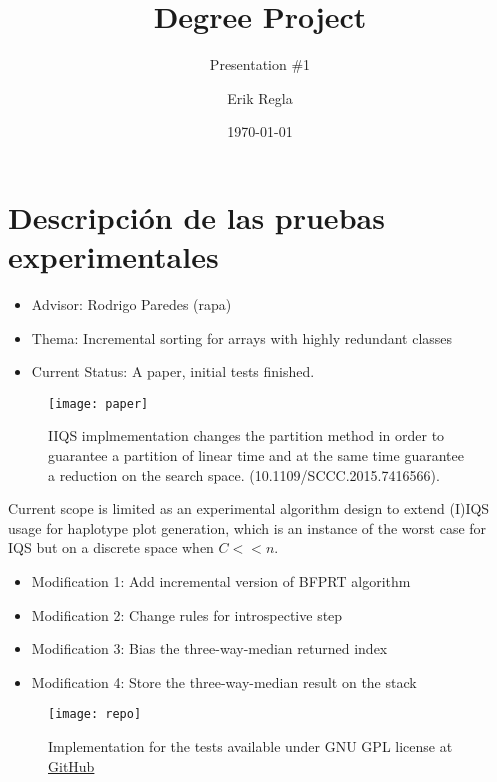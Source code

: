 \documentclass{beamer}
\title[Degree Project]{Degree Project}
\subtitle{Presentation \#1}
\author[E. Regla]{Erik Regla}
\institute[UTalca]{Universidad de Talca}
\date{\today}
\begin{document}
\begin{frame}
  \titlepage
\end{frame}

\section{Descripción de las pruebas experimentales}

\begin{frame}
  \begin{itemize}
  	\item Advisor: Rodrigo Paredes (rapa)
  	\item Thema: Incremental sorting for arrays with highly redundant classes
  	\item Current Status: A paper, initial tests finished.
  \end{itemize}
\end{frame}


\begin{frame}
    \centering
    \begin{figure}
        \texttt{[image: paper]}\\
        \caption{IIQS implmementation changes the partition method in order to guarantee a partition of linear time and at the same time guarantee a reduction on the search space. (10.1109/SCCC.2015.7416566).}
    \end{figure}
\end{frame}


\begin{frame}
    Current scope is limited as an experimental algorithm design to extend (I)IQS usage for haplotype plot generation, which is an instance of the worst case for IQS but on a discrete space when $C<<n$.\\
\begin{itemize}
    \item Modification 1: Add incremental version of BFPRT algorithm%
    \item Modification 2: Change rules for introspective step%
    \item Modification 3: Bias the three-way-median returned index%
    \item Modification 4: Store the three-way-median result on the stack
\end{itemize}
\end{frame}


\begin{frame}
    \centering
    \begin{figure}
        \texttt{[image: repo]}\\
        \caption{Implementation for the tests available under GNU GPL license at \href{https://github.com/KukyNekoi/magicode/tree/master/program/base_benchmark}{GitHub}}
    \end{figure}
\end{frame}
\end{document}
